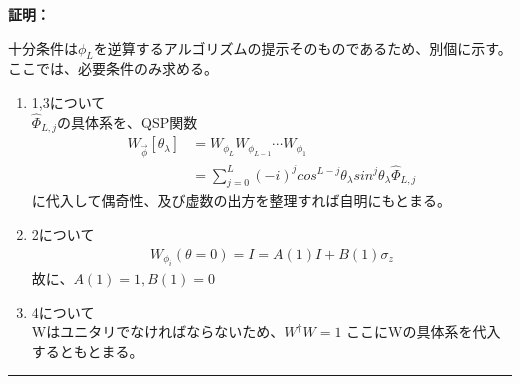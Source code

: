 \documentclass[a4paper,10.5pt]{article}
\numberwithin{equation}{section}
\newenvironment{proofbox}
{\begin{prooflabel}\textbf{証明：}\end{prooflabel}\vspace{0.8em}}
{\par\vspace{1em}\hrule\vspace{1em}}
\begin{document}
\begin{proofbox}
    十分条件は$\phi_{L}$を逆算するアルゴリズムの提示そのものであるため、別個に示す。ここでは、必要条件のみ求める。
    \begin{enumerate}
        \item 1,3について\\
        $\hat{\Phi}_{L,j}$の具体系を、QSP関数
        \begin{align*}
    W_{\vec{\phi}}[\theta_{\lambda}]&=W_{\phi_{L}}W_{\phi_{L-1}}\cdots W_{\phi_{1}}\\
    &=\sum_{j=0}^{L}(-i)^{j}cos^{L-j}\theta_{\lambda}sin^{j}\theta_{\lambda}\hat{\Phi}_{L,j}
\end{align*}
        に代入して偶奇性、及び虚数の出方を整理すれば自明にもとまる。
        \item 2について\
        \begin{align*}
            W_{\phi_{i}}(\theta=0)=I=A(1)I+B(1)\sigma_{z}
        \end{align*}
        故に、$A(1)=1,B(1)=0$
        \item 4について\\
        Wはユニタリでなければならないため、$W^{\dagger}W=1$
        ここにWの具体系を代入するともとまる。
    \end{enumerate}
\end{proofbox}
\end{document}
